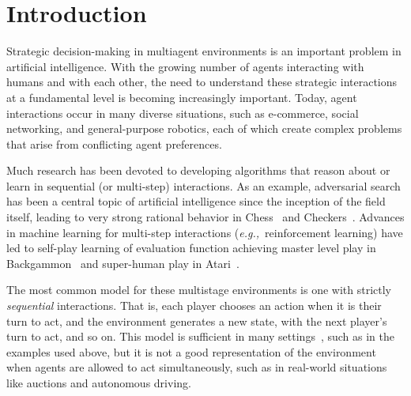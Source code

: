 \documentclass[preprint,12pt]{elsarticle}
\newcommand{\eg}{{\it e.g.,}~}
\begin{document}

\section{Introduction}
\label{sec:intro}

Strategic decision-making in multiagent environments is an important problem in artificial intelligence. 
With the growing number of agents interacting with humans and with each other, the need to 
understand these strategic interactions at a fundamental level is becoming increasingly important. 
Today, agent interactions occur in many diverse situations, such as e-commerce, social networking, and 
general-purpose robotics, each of which create complex problems that arise from conflicting agent 
preferences. 

Much research has been devoted to developing algorithms that reason about or learn in sequential (or multi-step) 
interactions. As an example, adversarial search has been a central topic of artificial intelligence 
since the inception of the field itself, leading to very strong rational behavior in 
Chess~\cite{Campbell02deepblue} and Checkers~\cite{Schaeffer96chinook}. Advances in machine learning for multi-step interactions 
(\eg reinforcement learning) have led to self-play learning of evaluation function achieving master level play 
in Backgammon~\cite{Tesauro95TDGammon} and super-human play in Atari~\cite{mnih-atari-2013,mnih-dqn-2015}.

The most common model for these multistage environments is one with strictly {\it sequential} 
interactions. That is, each player chooses an action when it is their turn to act, and the environment 
generates a new state, with the next player's turn to act, and so on. This model is sufficient in many 
settings~\cite{AIbook}, such as in the examples used above, but it is not a good representation of the 
environment when agents are allowed to act simultaneously, such as in real-world situations like auctions and 
autonomous driving. 
\end{document}
